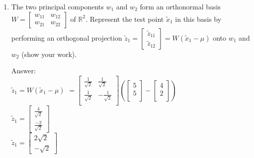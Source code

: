 \documentclass{article}
\def\ans#1{\par\gre{Answer: #1}}
\def\blu#1{{\color{blu}#1}}
\def\gre#1{{\color{gre}#1}}
\begin{document}
\begin{enumerate}
  \item The two principal components $w_1$ and $w_2$ form an orthonormal basis $W = \begin{bmatrix}w_{11} & w_{12}\\w_{21} & w_{22}\end{bmatrix}$ of $\mathbb{R}^2$. \blu{Represent the test point $\tilde{x}_1$ in this basis by performing an orthogonal projection $\tilde{z}_1 = \begin{bmatrix} \tilde{z}_{11} \\ \tilde{z}_{12} \end{bmatrix} = W(\tilde{x}_1-\mu)$ onto $w_1$ and $w_2$ (show your work).}
\ans{\\
$\tilde{z}_1=W(\tilde{x}_1-\mu)$
$=\begin{bmatrix}
    \frac{1}{\sqrt{2}} & \frac{1}{\sqrt{2}}\\
    \frac{1}{\sqrt{2}} & -\frac{1}{\sqrt{2}}\\
\end{bmatrix}
(\begin{bmatrix}
    5\\
    5\\
\end{bmatrix} -
\begin{bmatrix}
    4\\
    2\\
\end{bmatrix}
)$\\
$\tilde{z}_1=\begin{bmatrix}
    \frac{4}{\sqrt{2}} \\
    \frac{-2}{\sqrt{2}}
\end{bmatrix}$\\
$\tilde{z}_1=\begin{bmatrix}
    2\sqrt{2} \\
    -\sqrt{2}
\end{bmatrix}$
}
  \pagebreak


\end{enumerate}
\end{document}
